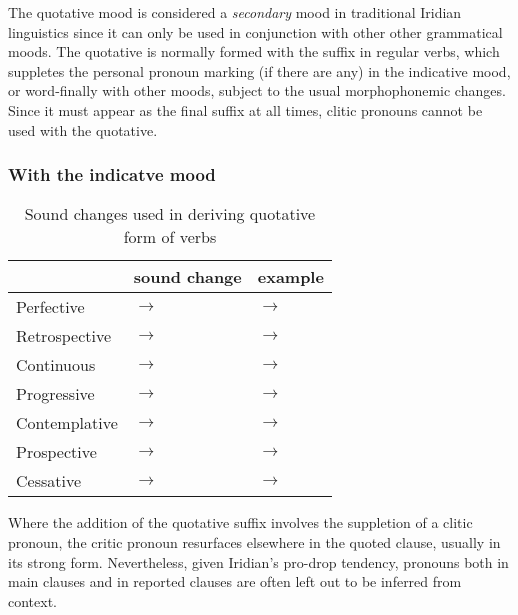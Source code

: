 The quotative mood is considered a \emph{secondary} mood in traditional Iridian linguistics since it can only be used in conjunction with other other grammatical moods. The quotative is normally formed with the suffix  in regular verbs, which suppletes the personal pronoun marking (if there are any) in the indicative mood, or word-finally with other moods, subject to the usual morphophonemic changes. Since it must appear as the final suffix at all times, clitic pronouns cannot be used with the quotative.

\subsubsection{With the indicatve mood}

\begin{table}
	\small
	\caption{Sound changes used in deriving quotative form of verbs}
	\medskip
	\label{tbl:quotind}
	\begin{tabu} to 0.9\textwidth {Y[0.7]YY}
		\toprule
										&	{\sc sound change}				& {\sc example}\\
		\midrule
				Perfective 		&
				 $\rightarrow$ 	&
				 $\rightarrow$ \\
				Retrospective &
				 $\rightarrow$  &
				 $\rightarrow$ \\
				Continuous &
				 $\rightarrow$  &
				 $\rightarrow$ \\
				Progressive &
				 $\rightarrow$  &
				 $\rightarrow$ \\
				Contemplative &
				 $\rightarrow$  &
				 $\rightarrow$ \\
				Prospective &
				 $\rightarrow$  &
				 $\rightarrow$ \\
				Cessative &
				 $\rightarrow$  &
				 $\rightarrow$ \\

			\bottomrule
	\end{tabu}

\end{table}

Where the addition of the quotative suffix  involves the suppletion of a clitic pronoun, the critic pronoun resurfaces elsewhere in the quoted clause, usually in its strong form. Nevertheless, given Iridian's pro-drop tendency, pronouns both in main clauses and in reported clauses are often left out to be inferred from context.

